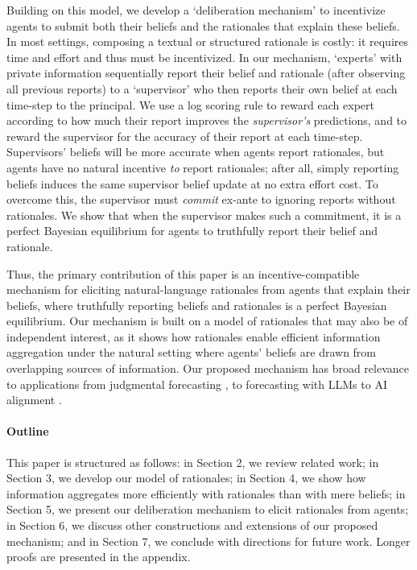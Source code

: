 \documentclass{winnower}
\begin{document}
Building on this model, we develop a `deliberation mechanism' to incentivize agents to submit both their beliefs and the rationales that explain these beliefs. In most settings, composing a textual or structured rationale is costly: it requires time and effort and thus must be incentivized. In our mechanism, `experts' with private information sequentially report their belief and rationale (after observing all previous reports) to a `supervisor' who then reports their own belief at each time-step to the principal.  We use a log scoring rule to reward each expert according to how much their report improves the \emph{supervisor's} predictions, and to reward the supervisor for the accuracy of their report at each time-step. Supervisors' beliefs will be more accurate when agents report rationales, but agents have no natural incentive \emph{to} report rationales; after all, simply reporting beliefs induces the same supervisor belief update at no extra effort cost. To overcome this, the supervisor must \emph{commit} ex-ante to ignoring reports without rationales. We show that when the supervisor makes such a commitment, it is a perfect Bayesian equilibrium for agents to truthfully report their belief and rationale.

Thus, the primary contribution of this paper is an incentive-compatible mechanism for eliciting natural-language rationales from agents that explain their beliefs, where truthfully reporting beliefs and rationales is a perfect Bayesian equilibrium. Our mechanism is built on a model of rationales that may also be of independent interest, as it shows how rationales enable efficient information aggregation under the natural setting where agents' beliefs are drawn from overlapping sources of information. Our proposed mechanism has broad relevance to applications from judgmental forecasting \citep{tetlock2016superforecasting}, to forecasting with LLMs \citep{halawi2024approaching, schoenegger2024wisdom, karger2024forecastbench} to AI alignment \citep{hubinger2020ai, bowman2022measuring}. 


\paragraph{Outline}  This paper is structured as follows: in Section 2, we review related work; in Section 3, we develop our model of rationales; in Section 4, we show how information aggregates more efficiently with rationales than with mere beliefs; in Section 5, we present our deliberation mechanism to elicit rationales from agents; in Section 6, we discuss other constructions and extensions of our proposed mechanism; and in Section 7, we conclude with directions for future work. Longer proofs are presented in the appendix.
\end{document}
